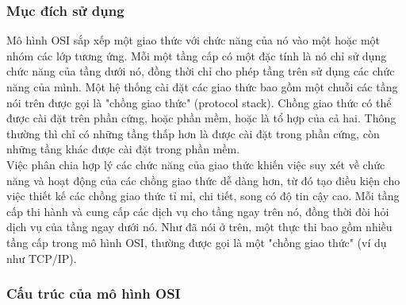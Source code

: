 \documentclass[a4paper,12pt]{article}
\begin{document}
\subsubsection{Mục đích sử dụng}
Mô hình OSI sắp xếp một giao thức với chức năng của nó vào một hoặc một nhóm các lớp tương ứng. Mỗi một tầng cấp có một đặc tính là nó chỉ sử dụng chức năng của tầng dưới nó, đồng thời chỉ cho phép tầng trên sử dụng các chức năng của mình. Một hệ thống cài đặt các giao thức bao gồm một chuỗi các tầng nói trên được gọi là "chồng giao thức" (protocol stack). Chồng giao thức có thể được cài đặt trên phần cứng, hoặc phần mềm, hoặc là tổ hợp của cả hai. Thông thường thì chỉ có những tầng thấp hơn là được cài đặt trong phần cứng, còn những tầng khác được cài đặt trong phần mềm.\\
Việc phân chia hợp lý các chức năng của giao thức khiến việc suy xét về chức năng và hoạt động của các chồng giao thức dễ dàng hơn, từ đó tạo điều kiện cho việc thiết kế các chồng giao thức tỉ mỉ, chi tiết, song có độ tin cậy cao. Mỗi tầng cấp thi hành và cung cấp các dịch vụ cho tầng ngay trên nó, đồng thời đòi hỏi dịch vụ của tầng ngay dưới nó. Như đã nói ở trên, một thực thi bao gồm nhiều tầng cấp trong mô hình OSI, thường được gọi là một "chồng giao thức" (ví dụ như TCP/IP).
\subsubsection{Cấu trúc của mô hình OSI}
\end{document}
